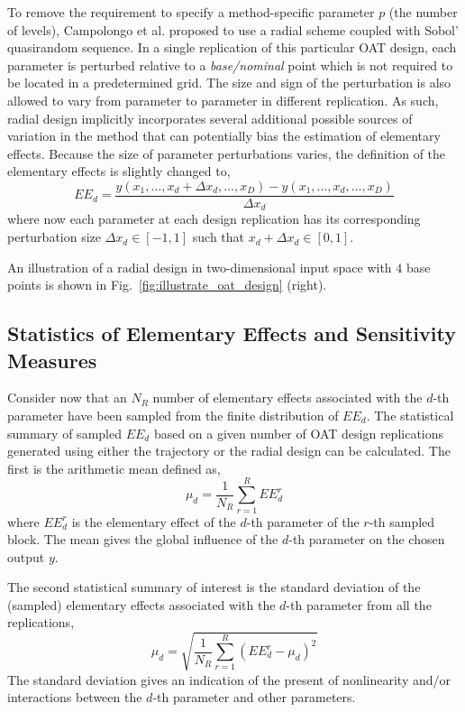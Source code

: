 To remove the requirement to specify a method-specific parameter $p$ (the number of levels),
Campolongo et al.\cite{Campolongo2011} proposed to use a radial scheme coupled with Sobol' quasirandom sequence.
In a single replication of this particular OAT design, 
each parameter is perturbed relative to a \textit{base/nominal} point 
which is not required to be located in a predetermined grid.
The size and sign of the perturbation is also allowed to vary from parameter to parameter in different replication.
As such, radial design implicitly incorporates several additional possible sources of variation in the method 
that can potentially bias the estimation of elementary effects.
Because the size of parameter perturbations varies, the definition of the elementary effects is slightly changed to,
\begin{equation}
EE_d = \frac{y(x_1, \dots, x_d+\Delta x_d,\dots,x_D) - y(x_1, \dots, x_d,\dots,x_D)}{\Delta x_d}
\end{equation}
where now each parameter at each design replication has its corresponding perturbation size $\Delta x_d \in [-1,1]$ such that $x_d + \Delta x_d \in [0,1]$.

An illustration of a radial design in two-dimensional input space with $4$ base points is shown in Fig.~\ref{fig:illustrate_oat_design} (right).
 
\subsection{Statistics of Elementary Effects and Sensitivity Measures}

Consider now that an $N_R$ number of elementary effects associated with the $d$-th parameter have been sampled from the finite distribution of $EE_d$.
The statistical summary of sampled $EE_d$ based on a given number of OAT design replications generated using either the trajectory or the radial design can be calculated.
The first is the arithmetic mean defined as,
\begin{equation}
	\mu_d = \frac{1}{N_R} \sum_{r = 1}^{R} EE^r_d
	\label{eq:sa_morris_mu}
\end{equation} 
where $EE^r_d$ is the elementary effect of the $d$-th parameter of the $r$-th sampled block.
The mean gives the global influence of the $d$-th parameter on the chosen output $y$.

The second statistical summary of interest is the standard deviation of the (sampled) elementary effects associated with the $d$-th parameter from all the replications,
\begin{equation}
	\mu_d = \sqrt{\frac{1}{N_R} \sum_{r = 1}^{R} (EE^r_d - \mu_d)^2}
	\label{eq:sa_morris_sd}
\end{equation} 
The standard deviation gives an indication of the present of nonlinearity and/or interactions between the $d$-th parameter and other parameters.

